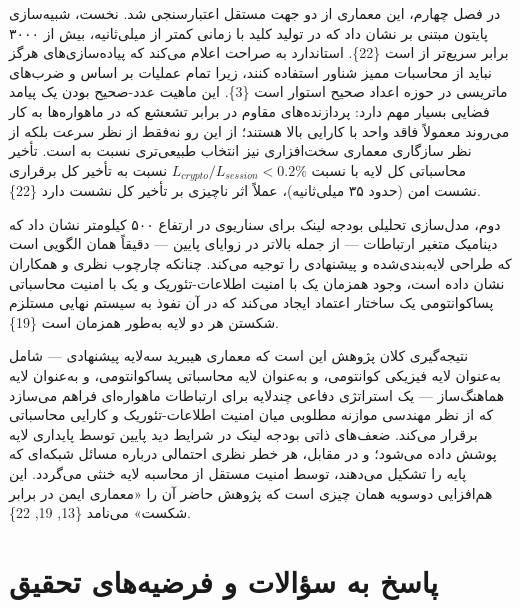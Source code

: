 \documentclass[a4paper,14pt]{extreport}
\begin{document}
در فصل چهارم، این معماری از دو جهت مستقل اعتبارسنجی شد. نخست، شبیه‌سازی پایتون مبتنی بر  نشان داد که  در تولید کلید با زمانی کمتر از  میلی‌ثانیه، بیش از ۳۰۰۰ برابر سریع‌تر از  است \{22\}. استاندارد  به صراحت اعلام می‌کند که پیاده‌سازی‌های  هرگز نباید از محاسبات ممیز شناور استفاده کنند، زیرا تمام عملیات بر اساس  و ضرب‌های ماتریسی در حوزه اعداد صحیح استوار است \{3\}. این ماهیت عدد-صحیح بودن یک پیامد فضایی بسیار مهم دارد: پردازنده‌های مقاوم در برابر تشعشع  که در ماهواره‌ها به کار می‌روند معمولاً فاقد واحد  با کارایی بالا هستند؛ از این رو  نه‌فقط از نظر سرعت بلکه از نظر سازگاری معماری سخت‌افزاری نیز انتخاب طبیعی‌تری نسبت به  است. تأخیر محاسباتی کل لایه  با نسبت $L_{crypto}/L_{session} < 0.2\%$ نسبت به تأخیر کل برقراری نشست امن (حدود ۳۵ میلی‌ثانیه)، عملاً اثر ناچیزی بر تأخیر کل نشست دارد \{22\}.

دوم، مدل‌سازی تحلیلی بودجه لینک  برای سناریوی  در ارتفاع ۵۰۰ کیلومتر نشان داد که دینامیک متغیر ارتباطات  --- از جمله  بالاتر در زوایای  پایین --- دقیقاً همان الگویی است که طراحی لایه‌بندی‌شده و  پیشنهادی را توجیه می‌کند. چنانکه چارچوب نظری  و همکاران نشان داده است، وجود همزمان یک  با امنیت اطلاعات-تئوریک  و یک  با امنیت محاسباتی پساکوانتومی  یک ساختار اعتماد  ایجاد می‌کند که در آن نفوذ به سیستم نهایی مستلزم شکستن هر دو لایه به‌طور همزمان است \{19\}.

نتیجه‌گیری کلان پژوهش این است که معماری هیبرید سه‌لایه پیشنهادی --- شامل  به‌عنوان لایه فیزیکی کوانتومی،  و  به‌عنوان لایه محاسباتی پساکوانتومی، و  به‌عنوان لایه هماهنگ‌ساز  --- یک استراتژی دفاعی چندلایه برای ارتباطات ماهواره‌ای  فراهم می‌سازد که از نظر مهندسی موازنه مطلوبی میان امنیت اطلاعات-تئوریک و کارایی محاسباتی برقرار می‌کند. ضعف‌های ذاتی بودجه لینک  در شرایط دید پایین توسط پایداری لایه  پوشش داده می‌شود؛ و در مقابل، هر خطر نظری احتمالی درباره مسائل شبکه‌ای که پایه  را تشکیل می‌دهند، توسط امنیت مستقل از محاسبه لایه  خنثی می‌گردد. این هم‌افزایی دوسویه همان چیزی است که پژوهش حاضر آن را «معماری ایمن در برابر شکست» می‌نامد \{13, 19, 22\}.
\section{پاسخ به سؤالات و فرضیه‌های تحقیق}
\end{document}
